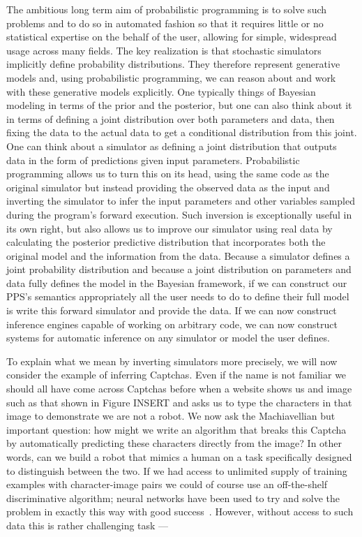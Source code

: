 The ambitious long
term aim of probabilistic programming is to solve such problems and to do so in automated fashion
so that it requires little or no statistical expertise on the behalf of the user, allowing for simple, widespread usage
across many fields.  The key realization is that stochastic simulators implicitly define probability distributions.
They therefore represent generative models and, using probabilistic programming, we can reason about and
work with these generative models explicitly.  One typically things of Bayesian modeling in terms of the
prior and the posterior, but one can also think about it in terms of defining a joint distribution over
both parameters and data, then fixing the data to the actual data to get a conditional distribution from
this joint.  One can think about a simulator as defining a joint distribution that outputs data in the form
of predictions given input parameters.  Probabilistic programming allows us to turn this on its head,
using the same code as the original simulator but instead providing the observed data as the input and
inverting the simulator to infer the input parameters and other variables sampled during the program's
forward execution.  Such inversion is exceptionally useful in its own right, but also allows us to improve
our simulator using real data by calculating the posterior predictive distribution that incorporates both
the original model and the information from the data.
Because a simulator defines a joint probability distribution and because a joint distribution on parameters
and data fully defines the model in the Bayesian framework, if 
we can construct our PPS's semantics appropriately all the user 
needs to do to define their full model is write this forward simulator and provide the data.
If we can now construct inference engines capable of working on arbitrary code, we can now 
construct systems for automatic inference on any simulator or model the user defines.

To explain what we mean by inverting simulators more precisely, we will now consider
the example of inferring Captchas.   Even if the name is not familiar we should all
have come across Captchas before when a website shows us and image such
as that shown in Figure INSERT and asks us to
type the characters in that image to demonstrate we are not a robot.  We now ask the
Machiavellian but important question: how might we write an algorithm that breaks this Captcha by 
automatically predicting these characters directly from the image? In other words, 
can we build a robot that mimics a human on a task specifically designed to 
distinguish between the two.  If we had access to unlimited supply of training examples with
character-image pairs we could of course use an off-the-shelf discriminative algorithm;
neural networks have been used to try and solve the problem in exactly this way with good
success~\citep{von2008recaptcha}.  However, without access to such data this is rather
challenging task --- 

